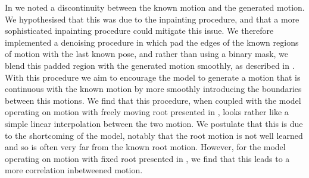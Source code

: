 In  we noted a discontinuity between the known motion and the generated motion. We hypothesised that this was due to the inpainting procedure, and that a more sophisticated inpainting procedure could mitigate this issue. We therefore implemented a denoising procedure in which pad the edges of the known regions of motion with the last known pose, and rather than using a binary mask, we blend this padded region with the generated motion smoothly, as described in . With this procedure we aim to encourage the model to generate a motion that is continuous with the known motion by more smoothly introducing the boundaries between this motions. We find that this procedure, when coupled with the model operating on motion with freely moving root presented in , looks rather like a simple linear interpolation between the two motion. We postulate that this is due to the shortcoming of the model, notably that the root motion is not well learned and so is often very far from the known root motion. However, for the model operating on motion with fixed root presented in , we find that this leads to a more correlation inbetweened motion.

